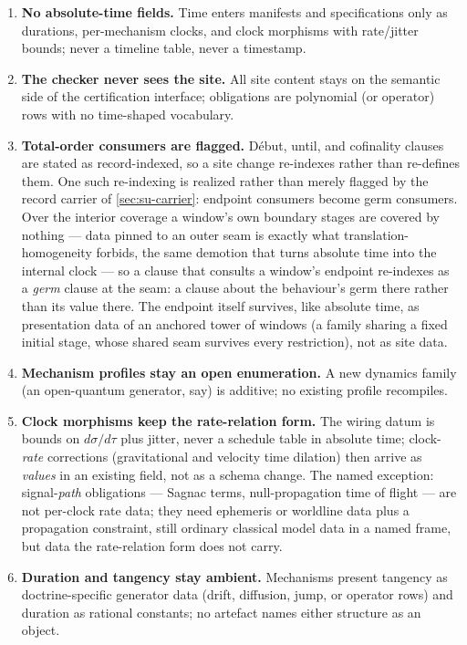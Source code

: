 \begin{enumerate}
\item[\textbf{F1.}] \textbf{No absolute-time fields.} Time enters
  manifests and
  specifications only as durations, per-mechanism clocks, and clock
  morphisms with rate/jitter bounds; never a timeline table, never a
  timestamp.
\item[\textbf{F2.}] \textbf{The checker never sees the site.} All
  site content
  stays on the semantic side of the certification interface;
  obligations are polynomial (or operator) rows with no time-shaped
  vocabulary.
\item[\textbf{F3.}] \textbf{Total-order consumers are flagged.}
  D\'ebut, until, and
  cofinality clauses are stated as record-indexed, so a site change
  re-indexes rather than re-defines them. One such re-indexing is
  realized rather than merely flagged by the record carrier of
  \autoref{sec:su-carrier}: endpoint consumers become germ
  consumers. Over the interior coverage a window's own boundary
  stages are covered by nothing --- data pinned to an outer seam is
  exactly what translation-homogeneity forbids, the same demotion
  that turns absolute time into the internal clock --- so a clause
  that consults a window's endpoint re-indexes as a \emph{germ}
  clause at the seam: a clause about the behaviour's germ there
  rather than its value there. The endpoint itself survives, like
  absolute time, as presentation data of an anchored tower of windows
  (a family sharing a fixed initial stage, whose shared seam survives
  every restriction), not as site data.
\item[\textbf{F4.}] \textbf{Mechanism profiles stay an open
  enumeration.} A new
  dynamics family (an open-quantum generator, say) is additive; no
  existing profile recompiles.
\item[\textbf{F5.}] \textbf{Clock morphisms keep the rate-relation
  form.} The
  wiring datum is bounds on $d\sigma/d\tau$ plus jitter, never a
  schedule table in absolute time; clock-\emph{rate} corrections
  (gravitational and velocity time dilation) then arrive as
  \emph{values} in an existing field, not as a schema change. The
  named exception: signal-\emph{path} obligations --- Sagnac terms,
  null-propagation time of flight --- are not per-clock rate data;
  they need ephemeris or worldline data plus a propagation
  constraint, still ordinary classical model data in a named frame,
  but data the rate-relation form does not carry.
\item[\textbf{F6.}] \textbf{Duration and tangency stay ambient.}
  Mechanisms present
  tangency as doctrine-specific generator data (drift, diffusion,
  jump, or operator rows) and duration as rational constants; no
  artefact names either structure as an object.
\end{enumerate}

